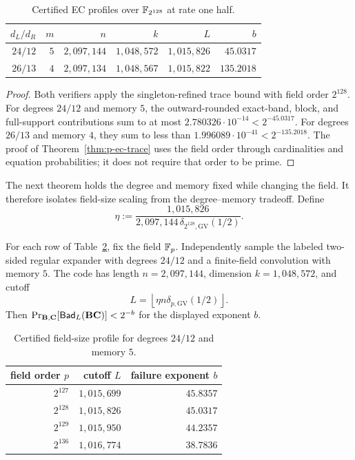 \begin{table}[ht]
\centering
\caption{Certified EC profiles over $\mathbb F_{2^{128}}$ at rate one half.}
\label{tab:gf128-ec-certificates}
\begin{tabular}{@{}rrrrrr@{}}
\toprule
$d_L/d_R$ & $m$ & $n$ & $k$ & $L$ & $b$ \\
\midrule
$24/12$ & $5$ & $2{,}097{,}144$ & $1{,}048{,}572$ & $1{,}015{,}826$ & $45.0317$ \\
$26/13$ & $4$ & $2{,}097{,}134$ & $1{,}048{,}567$ & $1{,}015{,}822$ & $135.2018$ \\
\bottomrule
\end{tabular}
\end{table}

\begin{proof}
Both verifiers apply the singleton-refined trace bound with field order
$2^{128}$.  For degrees $24/12$ and memory $5$, the outward-rounded exact-band,
block, and full-support contributions sum to at most
$2.780326\cdot10^{-14}<2^{-45.0317}$.  For degrees $26/13$ and memory $4$, they
sum to less than $1.996089\cdot10^{-41}<2^{-135.2018}$.  The proof of
Theorem~\ref{thm:p-ec-trace} uses the field order through cardinalities and
equation probabilities; it does not require that order to be prime.
\end{proof}

The next theorem holds the degree and memory fixed while changing the field.
It therefore isolates field-size scaling from the degree--memory tradeoff.
Define
\[
 \eta:=\frac{1{,}015{,}826}
 {2{,}097{,}144\,\delta_{2^{128},\mathrm{GV}}(1/2)}.
\]

\begin{theorem}
\label{thm:field-size-ec-certificates}
For each row of Table~\ref{tab:field-size-ec-certificates}, fix the field
$\mathbb F_p$.  Independently sample the labeled two-sided regular expander with
degrees $24/12$ and a finite-field convolution with memory $5$.  The code has
length $n=2{,}097{,}144$, dimension $k=1{,}048{,}572$, and cutoff
\[
 L=\left\lfloor \eta n\delta_{p,\mathrm{GV}}(1/2)\right\rfloor.
\]
Then $\Pr_{\mathbf B,\mathbf C}[\mathsf{Bad}_L(\mathbf B\mathbf C)]<2^{-b}$ for the displayed exponent $b$.
\end{theorem}

\begin{table}[ht]
\centering
\caption{Certified field-size profile for degrees $24/12$ and memory $5$.}
\label{tab:field-size-ec-certificates}
\begin{tabular}{@{}rrr@{}}
\toprule
field order $p$ & cutoff $L$ & failure exponent $b$ \\
\midrule
$2^{127}$ & $1{,}015{,}699$ & $45.8357$ \\
$2^{128}$ & $1{,}015{,}826$ & $45.0317$ \\
$2^{129}$ & $1{,}015{,}950$ & $44.2357$ \\
$2^{136}$ & $1{,}016{,}774$ & $38.7836$ \\
\bottomrule
\end{tabular}
\end{table}

